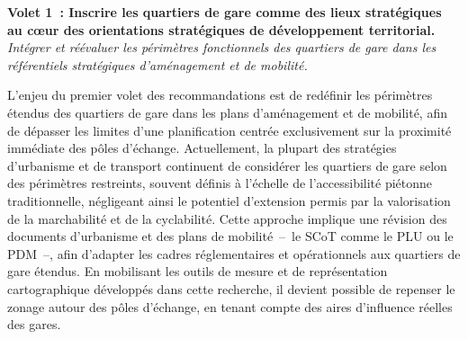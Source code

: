 \begin{refsegment}
    \begin{displayquote}
\textbf{Volet 1~: Inscrire les quartiers de gare comme des lieux stratégiques au cœur des orientations stratégiques de développement territorial.}
\\
\textsl{Intégrer et réévaluer les périmètres fonctionnels des quartiers de gare dans les référentiels stratégiques d’aménagement et de mobilité.}
    \end{displayquote}
L'enjeu du premier volet des recommandations est de redéfinir les périmètres étendus des quartiers de gare dans les plans d’aménagement et de mobilité, afin de dépasser les limites d’une planification centrée exclusivement sur la proximité immédiate des pôles d’échange. Actuellement, la plupart des stratégies d’urbanisme et de transport continuent de considérer les quartiers de gare selon des périmètres restreints, souvent définis à l’échelle de l’accessibilité piétonne traditionnelle, négligeant ainsi le potentiel d’extension permis par la valorisation de la \gls{marchabilité} et de la cyclabilité. Cette approche implique une révision des documents d’urbanisme et des plans de mobilité~–~le \acrfull{SCoT} comme le \acrfull{PLU} ou le \acrfull{PDM}~–, afin d’adapter les cadres réglementaires et opérationnels aux quartiers de gare étendus. En mobilisant les outils de mesure et de représentation cartographique développés dans cette recherche, il devient possible de repenser le zonage autour des pôles d’échange, en tenant compte des aires d’influence réelles des gares.%


\end{refsegment}
